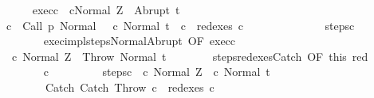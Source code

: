 \begin{isabellebody}
\ \ \ \ \isamarkupfalse%
\ exec{\isacharunderscore}c\ {\isachardoublequoteopen}{\isasymGamma}{\isasymturnstile}\ {\isasymlangle}cNormal\ Z{\isasymrangle}\ {\isasymRightarrow}\ Abrupt\ t{\isachardoublequoteclose}\isanewline
\ \ \ \ \isamarkupfalse%
\ {\isachardoublequoteopen}{\isasymexists}c{\isacharprime}{\isachardot}\ {\isasymGamma}{\isasymturnstile}\ {\isacharparenleft}Call\ p{\isacharcomma}\ Normal\ {\isasymsigma}{\isacharparenright}\ {\isasymrightarrow}\isactrlsup {\isacharplus}\ {\isacharparenleft}c{\isacharprime}{\isacharcomma}\ Normal\ t{\isacharparenright}\ {\isasymand}\ c\ {\isasymin}\ redexes\ c{\isacharprime}{\isachardoublequoteclose}\isanewline
\ \ \ \ \isamarkupfalse%
\ {\isacharminus}\isanewline
\ \ \ \ \ \ \isamarkupfalse%
\ steps{\isacharunderscore}c{\isacharprime}\isanewline
\ \ \ \ \ \ \isamarkupfalse%
\isanewline
\ \ \ \ \ \ \isamarkupfalse%
\ exec{\isacharunderscore}impl{\isacharunderscore}steps{\isacharunderscore}Normal{\isacharunderscore}Abrupt\ {\isacharbrackleft}OF\ exec{\isacharunderscore}c\isanewline
\ \ \ \ \ \ \isamarkupfalse%
\ {\isachardoublequoteopen}{\isasymGamma}{\isasymturnstile}\ {\isacharparenleft}c\ Normal\ Z{\isacharparenright}\ {\isasymrightarrow}\isactrlsup {\isacharasterisk}\ {\isacharparenleft}Throw{\isacharcomma}\ Normal\ t{\isacharparenright}{\isachardoublequoteclose}\isacommand{{\isachardot}}\isamarkupfalse%
\isanewline
\ \ \ \ \ \ \isamarkupfalse%
\ steps{\isacharunderscore}redexes{\isacharunderscore}Catch\ {\isacharbrackleft}OF\ this\ red{\isacharbrackright}\ \isanewline
\ \ \ \ \ \ \isamarkupfalse%
\ c{\isacharprime}{\isacharprime}\ \isanewline
\ \ \ \ \ \ \ \ steps{\isacharunderscore}c{\isacharprime}{\isacharprime}{\isacharcolon}\ {\isachardoublequoteopen}{\isasymGamma}{\isasymturnstile}\ {\isacharparenleft}c{\isacharprime}{\isacharcomma}\ Normal\ Z{\isacharparenright}\ {\isasymrightarrow}\isactrlsup {\isacharasterisk}\ {\isacharparenleft}c{\isacharprime}{\isacharprime}{\isacharcomma}\ Normal\ t{\isacharparenright}{\isachardoublequoteclose}\ \isanewline
\ \ \ \ \ \ \ \ Catch{\isacharcolon}\ {\isachardoublequoteopen}Catch\ Throw\ c\ {\isasymin}\ redexes\ c{\isacharprime}{\isacharprime}{\isachardoublequoteclose}\isanewline

\end{isabellebody}
